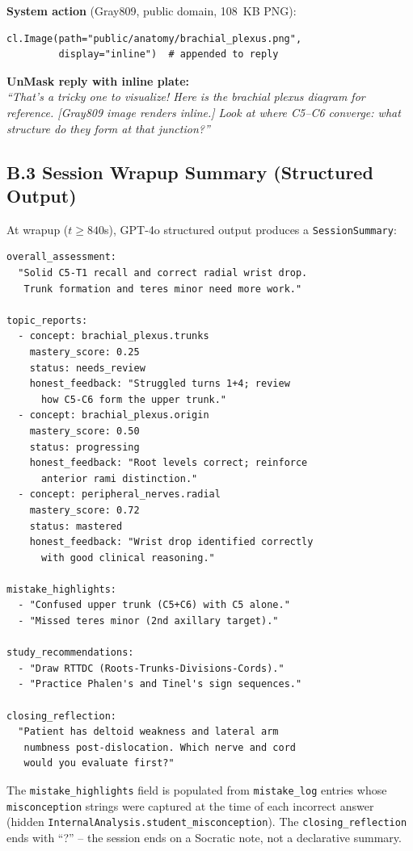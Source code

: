 \documentclass[11pt]{article}
\begin{document}
\noindent\textbf{System action} (Gray809, public domain, 108~KB PNG):
\begin{lstlisting}
cl.Image(path="public/anatomy/brachial_plexus.png",
         display="inline")  # appended to reply
\end{lstlisting}

\noindent\textbf{UnMask reply with inline plate:}\\
\textit{``That's a tricky one to visualize! Here is the brachial plexus
diagram for reference. [Gray809 image renders inline.] Look at where C5--C6
converge: what structure do they form at that junction?''}

\subsection*{B.3 Session Wrapup Summary (Structured Output)}

At wrapup ($t \geq 840$s), GPT-4o structured output produces
a \texttt{SessionSummary}:

\begin{lstlisting}
overall_assessment:
  "Solid C5-T1 recall and correct radial wrist drop.
   Trunk formation and teres minor need more work."

topic_reports:
  - concept: brachial_plexus.trunks
    mastery_score: 0.25
    status: needs_review
    honest_feedback: "Struggled turns 1+4; review
      how C5-C6 form the upper trunk."
  - concept: brachial_plexus.origin
    mastery_score: 0.50
    status: progressing
    honest_feedback: "Root levels correct; reinforce
      anterior rami distinction."
  - concept: peripheral_nerves.radial
    mastery_score: 0.72
    status: mastered
    honest_feedback: "Wrist drop identified correctly
      with good clinical reasoning."

mistake_highlights:
  - "Confused upper trunk (C5+C6) with C5 alone."
  - "Missed teres minor (2nd axillary target)."

study_recommendations:
  - "Draw RTTDC (Roots-Trunks-Divisions-Cords)."
  - "Practice Phalen's and Tinel's sign sequences."

closing_reflection:
  "Patient has deltoid weakness and lateral arm
   numbness post-dislocation. Which nerve and cord
   would you evaluate first?"
\end{lstlisting}

\noindent The \texttt{mistake\_highlights} field is populated from
\texttt{mistake\_log} entries whose \texttt{misconception} strings were
captured at the time of each incorrect answer (hidden
\texttt{InternalAnalysis.student\_misconception}).
The \texttt{closing\_reflection} ends with ``?'' -- the session ends on a
Socratic note, not a declarative summary.
\end{document}
